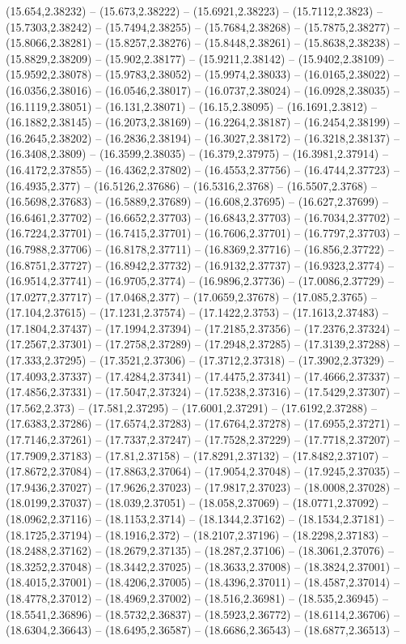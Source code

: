 {(15.654,2.38232) -- (15.673,2.38222) -- (15.6921,2.38223) -- (15.7112,2.3823) -- (15.7303,2.38242) -- (15.7494,2.38255) -- (15.7684,2.38268) -- (15.7875,2.38277) -- (15.8066,2.38281) -- (15.8257,2.38276) -- (15.8448,2.38261) -- (15.8638,2.38238) -- (15.8829,2.38209) -- (15.902,2.38177) -- (15.9211,2.38142) -- (15.9402,2.38109) -- (15.9592,2.38078) -- (15.9783,2.38052) -- (15.9974,2.38033) -- (16.0165,2.38022) -- (16.0356,2.38016) -- (16.0546,2.38017) -- (16.0737,2.38024) -- (16.0928,2.38035) -- (16.1119,2.38051) -- (16.131,2.38071) -- (16.15,2.38095) -- (16.1691,2.3812) -- (16.1882,2.38145) -- (16.2073,2.38169) -- (16.2264,2.38187) -- (16.2454,2.38199) -- (16.2645,2.38202) -- (16.2836,2.38194) -- (16.3027,2.38172) -- (16.3218,2.38137) -- (16.3408,2.3809) -- (16.3599,2.38035) -- (16.379,2.37975) -- (16.3981,2.37914) -- (16.4172,2.37855) -- (16.4362,2.37802) -- (16.4553,2.37756) -- (16.4744,2.37723) -- (16.4935,2.377) -- (16.5126,2.37686) -- (16.5316,2.3768) -- (16.5507,2.3768) -- (16.5698,2.37683) -- (16.5889,2.37689) -- (16.608,2.37695) -- (16.627,2.37699) -- (16.6461,2.37702) -- (16.6652,2.37703) -- (16.6843,2.37703) -- (16.7034,2.37702) -- (16.7224,2.37701) -- (16.7415,2.37701) -- (16.7606,2.37701) -- (16.7797,2.37703) -- (16.7988,2.37706) -- (16.8178,2.37711) -- (16.8369,2.37716) -- (16.856,2.37722) -- (16.8751,2.37727) -- (16.8942,2.37732) -- (16.9132,2.37737) -- (16.9323,2.3774) -- (16.9514,2.37741) -- (16.9705,2.3774) -- (16.9896,2.37736) -- (17.0086,2.37729) -- (17.0277,2.37717) -- (17.0468,2.377) -- (17.0659,2.37678) -- (17.085,2.3765) -- (17.104,2.37615) -- (17.1231,2.37574) -- (17.1422,2.3753) -- (17.1613,2.37483) -- (17.1804,2.37437) -- (17.1994,2.37394) -- (17.2185,2.37356) -- (17.2376,2.37324) -- (17.2567,2.37301) -- (17.2758,2.37289) -- (17.2948,2.37285) -- (17.3139,2.37288) -- (17.333,2.37295) -- (17.3521,2.37306) -- (17.3712,2.37318) -- (17.3902,2.37329) -- (17.4093,2.37337) -- (17.4284,2.37341) -- (17.4475,2.37341) -- (17.4666,2.37337) -- (17.4856,2.37331) -- (17.5047,2.37324) -- (17.5238,2.37316) -- (17.5429,2.37307) -- (17.562,2.373) -- (17.581,2.37295) -- (17.6001,2.37291) -- (17.6192,2.37288) -- (17.6383,2.37286) -- (17.6574,2.37283) -- (17.6764,2.37278) -- (17.6955,2.37271) -- (17.7146,2.37261) -- (17.7337,2.37247) -- (17.7528,2.37229) -- (17.7718,2.37207) -- (17.7909,2.37183) -- (17.81,2.37158) -- (17.8291,2.37132) -- (17.8482,2.37107) -- (17.8672,2.37084) -- (17.8863,2.37064) -- (17.9054,2.37048) -- (17.9245,2.37035) -- (17.9436,2.37027) -- (17.9626,2.37023) -- (17.9817,2.37023) -- (18.0008,2.37028) -- (18.0199,2.37037) -- (18.039,2.37051) -- (18.058,2.37069) -- (18.0771,2.37092) -- (18.0962,2.37116) -- (18.1153,2.3714) -- (18.1344,2.37162) -- (18.1534,2.37181) -- (18.1725,2.37194) -- (18.1916,2.372) -- (18.2107,2.37196) -- (18.2298,2.37183) -- (18.2488,2.37162) -- (18.2679,2.37135) -- (18.287,2.37106) -- (18.3061,2.37076) -- (18.3252,2.37048) -- (18.3442,2.37025) -- (18.3633,2.37008) -- (18.3824,2.37001) -- (18.4015,2.37001) -- (18.4206,2.37005) -- (18.4396,2.37011) -- (18.4587,2.37014) -- (18.4778,2.37012) -- (18.4969,2.37002) -- (18.516,2.36981) -- (18.535,2.36945) -- (18.5541,2.36896) -- (18.5732,2.36837) -- (18.5923,2.36772) -- (18.6114,2.36706) -- (18.6304,2.36643) -- (18.6495,2.36587) -- (18.6686,2.36543) -- (18.6877,2.36513) -- }
